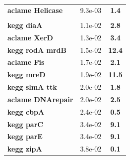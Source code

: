 \begin{landscape}
\begin{table}
{\begin{minipage}[t]{0.3\textwidth}
\begin{tabular}{>{\bfseries}p{\textwidth}cc}
\rowcolor{posit}aclame Helicase&9.3e-03&\textbf{\colorbox{colorpower}{1.4}}\\
\\
\rowcolor{posit2}kegg diaA&1.1e-02&\textbf{\colorbox{colorpowerx}{2.8}}\\
\rowcolor{posit2}aclame XerD&1.3e-02&\textbf{\colorbox{colorpowerx}{3.4}}\\
\rowcolor{posit2}kegg rodA mrdB&1.5e-02&\textbf{\colorbox{colorpowerxx}{12.4}}\\
\rowcolor{posit2}aclame Fis&1.7e-02&\textbf{\colorbox{colorpower}{2.1}}\\
\rowcolor{posit2}kegg mreD&1.9e-02&\textbf{\colorbox{colorpowerxx}{11.5}}\\
\rowcolor{posit2}kegg slmA ttk&2.0e-02&\textbf{\colorbox{colorpower}{1.8}}\\
\rowcolor{posit2}aclame DNArepair&2.0e-02&\textbf{\colorbox{colorpower}{2.5}}\\
\rowcolor{posit2}kegg cbpA&2.4e-02&\textbf{\colorbox{colorpowerneg}{0.5}}\\
\rowcolor{posit2}kegg parC&3.4e-02&\textbf{\colorbox{colorpowerxx}{9.1}}\\
\rowcolor{posit2}kegg parE&3.4e-02&\textbf{\colorbox{colorpowerxx}{9.1}}\\
\rowcolor{posit2}kegg zipA&3.8e-02&\textbf{\colorbox{colorpowernegxx}{0.1}}\\
	\end{tabular}
	\end{minipage}}
	\hspace{1.7cm}
\end{table}
\end{landscape}
